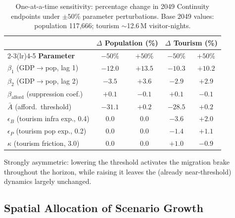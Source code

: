 \documentclass[urbansci,article,submit,pdftex,moreauthors]{Definitions/mdpi}
\begin{document}
\begin{table}[H]
\caption{One-at-a-time sensitivity: percentage change in 2049 Continuity endpoints
under $\pm50\%$ parameter perturbations. Base 2049 values: population 117{,}666;
tourism $\sim$12.6\,M visitor-nights.}
\label{tab:sensitivity}
\begin{threeparttable}
\begin{tabularx}{\textwidth}{Xcccc}
\toprule
 & \multicolumn{2}{c}{\textbf{$\Delta$ Population (\%)}}
 & \multicolumn{2}{c}{\textbf{$\Delta$ Tourism (\%)}} \\
\cmidrule(lr){2-3}\cmidrule(lr){4-5}
\textbf{Parameter} & \textbf{$-50\%$} & \textbf{$+50\%$}
                   & \textbf{$-50\%$} & \textbf{$+50\%$} \\
\midrule
$\beta_1$ (GDP$\to$pop, lag 1)            & $-12.0$ & $+13.5$ & $-10.3$ & $+10.2$ \\
$\beta_2$ (GDP$\to$pop, lag 2)            & $-3.5$  & $+3.6$  & $-2.9$  & $+2.9$ \\
$\beta_\text{afford}$ (suppression coef.)& $+0.1$  & $-0.1$  & $+0.1$  & $-0.1$ \\
$\bar A$ (afford.\ threshold)\tnote{$\dagger$} & $-31.1$ & $+0.2$ & $-28.5$ & $+0.2$ \\
$\epsilon_B$ (tourism infra exp., 0.4)   & $0.0$   & $0.0$   & $-3.6$  & $+2.0$ \\
$\epsilon_P$ (tourism pop exp., 0.2)     & $0.0$   & $0.0$   & $-1.4$  & $+1.1$ \\
$\kappa$ (tourism friction, 3.0)         & $0.0$   & $0.0$   & $+1.0$  & $-0.9$ \\
\bottomrule
\end{tabularx}
\begin{tablenotes}
\item[$\dagger$] Strongly asymmetric: lowering the threshold activates the
migration brake throughout the horizon, while raising it leaves the (already
near-threshold) dynamics largely unchanged.
\end{tablenotes}
\end{threeparttable}
\end{table}

\subsection{Spatial Allocation of Scenario Growth}
\label{subsec:spatial}
\end{document}
